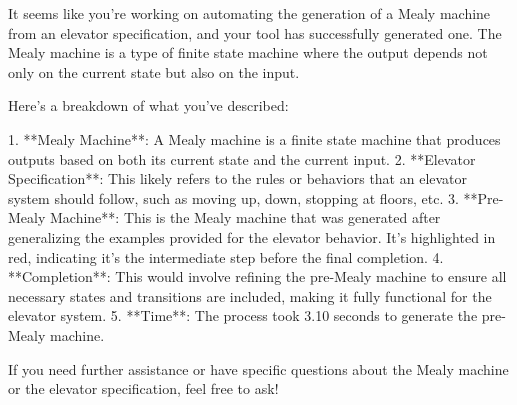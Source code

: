It seems like you're working on automating the generation of a Mealy machine from an elevator specification, and your tool has successfully generated one. The Mealy machine is a type of finite state machine where the output depends not only on the current state but also on the input.

Here's a breakdown of what you've described:

1. **Mealy Machine**: A Mealy machine is a finite state machine that produces outputs based on both its current state and the current input.
2. **Elevator Specification**: This likely refers to the rules or behaviors that an elevator system should follow, such as moving up, down, stopping at floors, etc.
3. **Pre-Mealy Machine**: This is the Mealy machine that was generated after generalizing the examples provided for the elevator behavior. It's highlighted in red, indicating it's the intermediate step before the final completion.
4. **Completion**: This would involve refining the pre-Mealy machine to ensure all necessary states and transitions are included, making it fully functional for the elevator system.
5. **Time**: The process took 3.10 seconds to generate the pre-Mealy machine.

If you need further assistance or have specific questions about the Mealy machine or the elevator specification, feel free to ask!